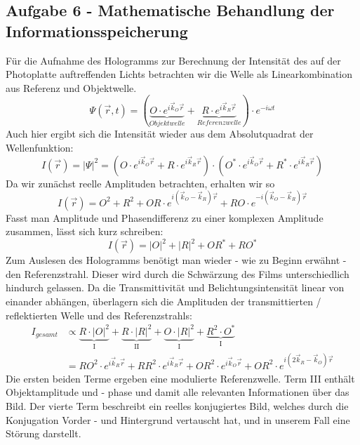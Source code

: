 \subsection*{Aufgabe 6 - Mathematische Behandlung der Informationsspeicherung}
Für die Aufnahme des Hologramms zur Berechnung der Intensität des auf der Photoplatte auftreffenden Lichts betrachten wir die Welle als Linearkombination aus Referenz und Objektwelle.
\begin{equation}
	\Psi(\vec{r},t) = (\underbrace{O\cdot e^{i\vec{k}_O\vec{r}}}_{Objektwelle} + \underbrace{R\cdot e^{i\vec{k}_R\vec{r}}}_{Referenzwelle})\cdot e^{-i\omega t}
\end{equation}
Auch hier ergibt sich die Intensität wieder aus dem Absolutquadrat der Wellenfunktion:
\begin{equation}
	I(\vec{r}) = \left| \Psi \right|^2 = (O\cdot e^{i\vec{k}_O\vec{r}} + R\cdot e^{i\vec{k}_R\vec{r}})\cdot (O^*\cdot e^{i\vec{k}_O\vec{r}} + R^*\cdot e^{i\vec{k}_R\vec{r}})
\end{equation}
Da wir zunächst reelle Amplituden betrachten, erhalten wir so
\begin{equation}
	I(\vec{r}) = O^2 + R^2 + OR\cdot e^{i(\vec{k}_O -\vec{k}_R)\vec{r}} + RO \cdot e^{-i(\vec{k}_O -\vec{k}_R)\vec{r}}
\end{equation}
Fasst man Amplitude und Phasendifferenz zu einer komplexen Amplitude zusammen, lässt sich kurz schreiben:
\begin{equation}
	I(\vec{r}) = \left| O \right|^2 + \left| R \right|^2 + OR^* + RO^*
\end{equation}
Zum Auslesen des Hologramms benötigt man wieder - wie zu Beginn erwähnt - den Referenzstrahl. Dieser wird durch die Schwärzung des Films unterschiedlich hindurch gelassen. Da die Transmittivität und Belichtungsintensität linear von einander abhängen,  überlagern sich die Amplituden der transmittierten / reflektierten Welle und des Referenzstrahls:
\begin{align}
	I_{gesamt} &\propto \underbrace{R \cdot \left| O \right|^2}_{\text{I}} + \underbrace{R \cdot \left| R \right|^2}_{\text{II}} + \underbrace{O \cdot \left| R \right|^2}_{\text{I}} + \underbrace{R^2 \cdot O^*}_{\text{I}}\\
	&= RO^2\cdot e^{i\vec{k}_R\vec{r}} + RR^2\cdot e^{i\vec{k}_R\vec{r}} + OR^2\cdot e^{i\vec{k}_O\vec{r}} + OR^2\cdot e^{i(2\vec{k}_R - \vec{k}_O)\vec{r}}
\end{align}
Die ersten beiden Terme ergeben eine modulierte Referenzwelle. Term III enthält Objektamplitude und - phase und damit alle relevanten Informationen über das Bild. Der vierte Term beschreibt ein reelles konjugiertes Bild, welches durch die Konjugation Vorder - und Hintergrund vertauscht hat, und in unserem Fall eine Störung darstellt.
